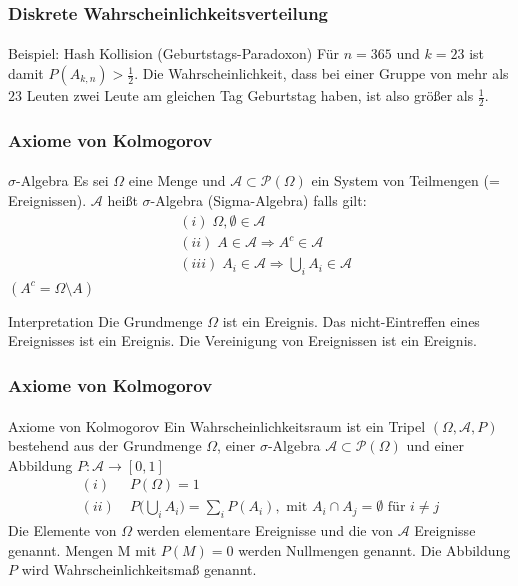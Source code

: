 \documentclass{beamer}
\begin{document}
\begin{frame}
    \frametitle{Diskrete Wahrscheinlichkeitsverteilung}
\framesubtitle{}

\begin{block}{Beispiel: Hash Kollision (Geburtstags-Paradoxon)}
Für $n=365$ und $k=23$ ist damit $ P(A_{k,n} ) > \frac{1}{2}$. Die Wahrscheinlichkeit, dass bei einer Gruppe von mehr als $23$ Leuten zwei Leute am gleichen Tag Geburtstag haben, ist also größer als $ \frac{1}{2}$.
\end{block}



 \end{frame}




\begin{frame}
    \frametitle{Axiome von Kolmogorov}
\framesubtitle{}
\begin{block}{$\sigma$-Algebra}
Es sei $\Omega$ eine Menge und $\mathcal{A} \subset  \mathcal{P}(\Omega)$ ein System von Teilmengen (= Ereignissen). $\mathcal{A}$ heißt $\sigma$-Algebra (Sigma-Algebra) falls gilt:
\begin{align*}
& (i) \; \Omega, \emptyset \in \mathcal{A} \\
& (ii) \; A \in \mathcal{A} \Rightarrow A^c \in \mathcal{A} \\
& (iii) \; A_i \in \mathcal{A} \Rightarrow \bigcup_i A_i \in \mathcal{A} 
\end{align*}
$(A^c = \Omega \setminus A)$
\end{block}

\begin{block}{Interpretation}
Die Grundmenge $\Omega$ ist ein Ereignis. Das nicht-Eintreffen eines Ereignisses ist ein Ereignis. Die Vereinigung von Ereignissen ist ein Ereignis.
\end{block}


 \end{frame}


\begin{frame}
    \frametitle{Axiome von Kolmogorov}
\framesubtitle{}
\begin{block}{Axiome von Kolmogorov}
Ein Wahrscheinlichkeitsraum ist ein Tripel $(\Omega, \mathcal{A}, P)$ bestehend aus der Grundmenge $\Omega$, einer $\sigma$-Algebra $\mathcal{A} \subset  \mathcal{P}(\Omega)$ und einer Abbildung
$P : \mathcal{A} \to [0,1]$
\begin{align*}
(i) & \; P(\Omega) = 1 \\
(ii) & \;  P \biggl(  \bigcup_i A_i  \biggr) = \sum_i P(A_i), \text{ mit } A_i \cap A_j = \emptyset \text{ für } i \neq j
\end{align*}
Die Elemente von $\Omega$ werden elementare Ereignisse und die von $\mathcal{A}$ Ereignisse genannt. Mengen M mit $P(M) = 0$ werden Nullmengen genannt.
Die Abbildung $P$ wird Wahrscheinlichkeitsmaß genannt.
\end{block}


 \end{frame}
\end{document}
